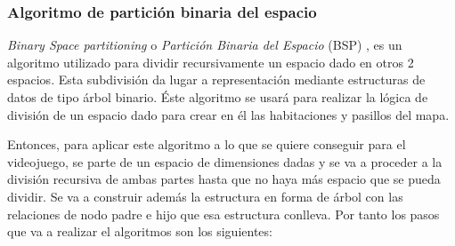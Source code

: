 \subsubsection{Algoritmo de partición binaria del espacio} 
\label{subsubsec:particionbinaria}

\textit{Binary Space partitioning} o \textit{Partición Binaria del Espacio} (BSP) \cite{BSP}, es un algoritmo utilizado para dividir recursivamente un espacio dado en otros 2 espacios. Esta subdivisión da lugar a representación mediante estructuras de datos de tipo árbol binario. Éste algoritmo se usará para realizar la lógica de división de un espacio dado para crear en él las habitaciones y pasillos del mapa.

Entonces, para aplicar este algoritmo a lo que se quiere conseguir para el videojuego, se parte de un espacio de dimensiones dadas y se va a proceder a la división recursiva de ambas partes hasta que no haya más espacio que se pueda dividir. Se va a construir además la estructura en forma de árbol con las relaciones de nodo padre e hijo que esa estructura conlleva. Por tanto los pasos que va a realizar el algoritmos son los siguientes:

